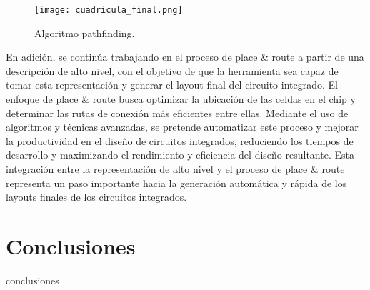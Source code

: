 \documentclass[reprint,amsmath,amssymb,aps]{revtex4-2}
\begin{document}
\begin{figure}[H]
	\centering
	\texttt{[image: cuadricula\_final.png]}
	\caption{Algoritmo pathfinding.}
	\label{cuadricula_final}
\end{figure}

En adición, se continúa trabajando en el proceso de place \& route a partir de una descripción de alto nivel, con el objetivo de que la herramienta sea capaz de tomar esta representación y generar el layout final del circuito integrado. El enfoque de place \& route busca optimizar la ubicación de las celdas en el chip y determinar las rutas de conexión más eficientes entre ellas. Mediante el uso de algoritmos y técnicas avanzadas, se pretende automatizar este proceso y mejorar la productividad en el diseño de circuitos integrados, reduciendo los tiempos de desarrollo y maximizando el rendimiento y eficiencia del diseño resultante. Esta integración entre la representación de alto nivel y el proceso de place \& route representa un paso importante hacia la generación automática y rápida de los layouts finales de los circuitos integrados.

\section{Conclusiones}
conclusiones
  

\nocite{*}
\end{document}
